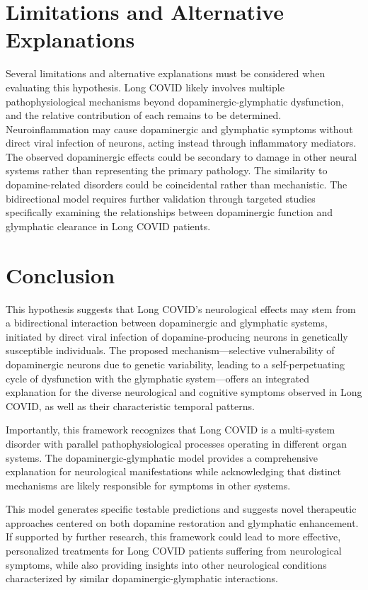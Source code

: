 \documentclass[12pt]{article}
\begin{document}
\section{Limitations and Alternative Explanations}

Several limitations and alternative explanations must be considered when evaluating this hypothesis. Long COVID likely involves multiple pathophysiological mechanisms beyond dopaminergic-glymphatic dysfunction, and the relative contribution of each remains to be determined. Neuroinflammation may cause dopaminergic and glymphatic symptoms without direct viral infection of neurons, acting instead through inflammatory mediators. The observed dopaminergic effects could be secondary to damage in other neural systems rather than representing the primary pathology. The similarity to dopamine-related disorders could be coincidental rather than mechanistic. The bidirectional model requires further validation through targeted studies specifically examining the relationships between dopaminergic function and glymphatic clearance in Long COVID patients.

\section{Conclusion}

This hypothesis suggests that Long COVID's neurological effects may stem from a bidirectional interaction between dopaminergic and glymphatic systems, initiated by direct viral infection of dopamine-producing neurons in genetically susceptible individuals. The proposed mechanism—selective vulnerability of dopaminergic neurons due to genetic variability, leading to a self-perpetuating cycle of dysfunction with the glymphatic system—offers an integrated explanation for the diverse neurological and cognitive symptoms observed in Long COVID, as well as their characteristic temporal patterns.

Importantly, this framework recognizes that Long COVID is a multi-system disorder with parallel pathophysiological processes operating in different organ systems. The dopaminergic-glymphatic model provides a comprehensive explanation for neurological manifestations while acknowledging that distinct mechanisms are likely responsible for symptoms in other systems.

This model generates specific testable predictions and suggests novel therapeutic approaches centered on both dopamine restoration and glymphatic enhancement. If supported by further research, this framework could lead to more effective, personalized treatments for Long COVID patients suffering from neurological symptoms, while also providing insights into other neurological conditions characterized by similar dopaminergic-glymphatic interactions.



\end{document}
